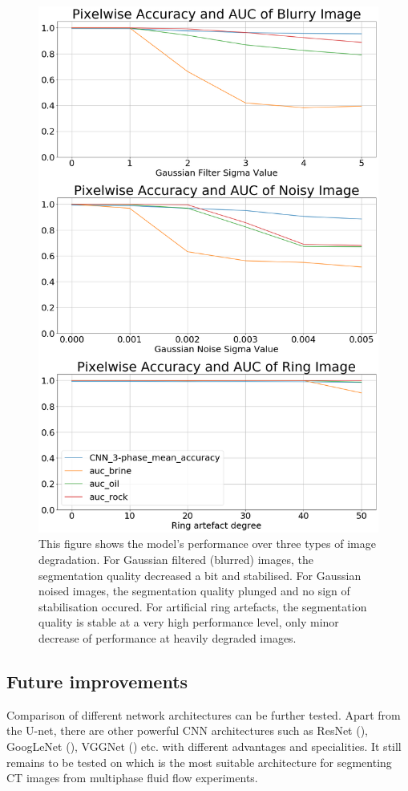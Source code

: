 \documentclass[draft,linenumbers]{agujournal2018}
\begin{document}
\begin{figure}[h]
 \centering
 \includegraphics[width=33pc]{imgs/acc_auc.png}
 \caption{This figure shows the model's performance over three types of image degradation. For Gaussian filtered (blurred) images, the segmentation quality decreased a bit and stabilised. For Gaussian noised images, the segmentation quality plunged and no sign of stabilisation occured. For artificial ring artefacts, the segmentation quality is stable at a very high performance level, only minor decrease of performance at heavily degraded images.}
 \label{robustness}
 \end{figure}
 

\subsection{Future improvements}
Comparison of different network architectures can be further tested. Apart from the U-net, there are other powerful CNN architectures such as ResNet (\citet{he2016deep}), GoogLeNet (\citet{szegedy2015going}), VGGNet (\citet{simonyan2014very}) etc. with different advantages and specialities. It still remains to be tested on which is the most suitable architecture for segmenting \textmu CT images from multiphase fluid flow experiments.
\end{document}
